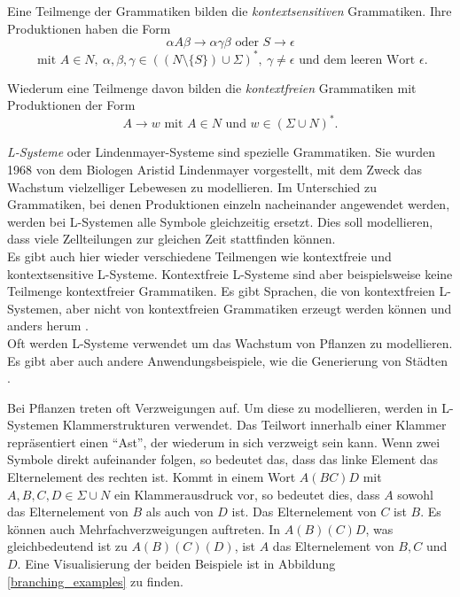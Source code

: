 Eine Teilmenge der Grammatiken bilden die \emph{kontextsensitiven} Grammatiken. Ihre Produktionen haben die Form
\[\alpha A \beta \rightarrow \alpha \gamma \beta \text{ oder } S \rightarrow \epsilon\] \[\text{ mit } A \in N,~ \alpha, \beta, \gamma \in ((N \setminus \{ S \}) \cup \Sigma)^*,~ \gamma \neq \epsilon \text{ und dem leeren Wort } \epsilon.\]

Wiederum eine Teilmenge davon bilden die \emph{kontextfreien} Grammatiken mit Produktionen der Form 
\[A \rightarrow w \text{ mit } A \in N \text{ und } w \in (\Sigma \cup N)^*.\] \cite[Abschnitte 1.4 und 1.5]{FormalLanguageTheory}

\emph{L-Systeme} oder Lindenmayer-Systeme sind spezielle Grammatiken. Sie wurden 1968 von dem Biologen Aristid Lindenmayer vorgestellt, mit dem Zweck das Wachstum vielzelliger Lebewesen zu modellieren. Im Unterschied zu Grammatiken, bei denen Produktionen einzeln nacheinander angewendet werden, werden bei L-Systemen alle Symbole gleichzeitig ersetzt. Dies soll modellieren, dass viele Zellteilungen zur gleichen Zeit stattfinden können.\\
Es gibt auch hier wieder verschiedene Teilmengen wie \zb kontextfreie und kontextsensitive L-Systeme. Kontextfreie L-Systeme sind aber beispielsweise keine Teilmenge kontextfreier Grammatiken. Es gibt Sprachen, die von kontextfreien L-Systemen, aber nicht von kontextfreien Grammatiken erzeugt werden können und anders herum \cite[Abbildung 1.2]{AlgorithmicBeautyOfPlants}.\\
Oft werden L-Systeme verwendet um das Wachstum von Pflanzen zu modellieren. Es gibt aber auch andere Anwendungsbeispiele, wie \zb die Generierung von Städten \cite{cityGeneration}. 

Bei Pflanzen treten oft Verzweigungen auf. Um diese zu modellieren, werden in L-Systemen Klammerstrukturen verwendet. Das Teilwort innerhalb einer Klammer repräsentiert einen "`Ast"', der wiederum in sich verzweigt sein kann.
Wenn zwei Symbole direkt aufeinander folgen, so bedeutet das, dass das linke Element das Elternelement des rechten ist. Kommt in einem Wort $A(BC)D$ mit $A, B, C, D \in \Sigma \cup N$ ein Klammerausdruck vor, so bedeutet dies, dass $A$ sowohl das Elternelement von $B$ als auch von $D$ ist. Das Elternelement von $C$ ist $B$. Es können auch Mehrfachverzweigungen auftreten. In $A(B)(C)D$, was gleichbedeutend ist zu $A(B)(C)(D)$, ist $A$ das Elternelement von $B, C$ und $D$. Eine Visualisierung der beiden Beispiele ist in Abbildung \ref{branching_examples} zu finden. \cite[Kapitel 1]{AlgorithmicBeautyOfPlants}

